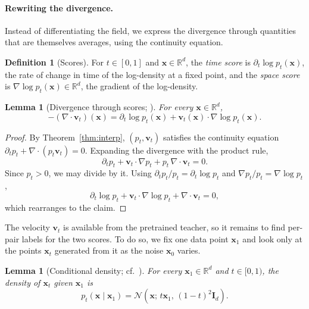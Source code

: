\documentclass[11pt,a4paper]{article}
\numberwithin{equation}{section}     %
\theoremstyle{plain}        %
\newtheorem{lemma}[theorem]{Lemma}
\theoremstyle{definition}   %
\newtheorem{definition}[theorem]{Definition}
\theoremstyle{remark}       %
\begin{document}
\paragraph{Rewriting the divergence.} Instead of differentiating the field, we express the divergence through quantities that are themselves averages, using the continuity equation.

\begin{definition}[Scores]\label{def:scores}
For $t\in[0,1]$ and $\mathbf{x}\in\mathbb{R}^d$, the \emph{time score} is $\partial_t\log p_t(\mathbf{x})$, the rate of change in time of the log-density at a fixed point, and the \emph{space score} is $\nabla\log p_t(\mathbf{x})\in\mathbb{R}^d$, the gradient of the log-density.
\end{definition}

\begin{lemma}[Divergence through scores; \citealp{ouyang2026}]\label{lem:divscores}
For every $\mathbf{x}\in\mathbb{R}^d$,
\[
-\left(\nabla\cdot\mathbf{v}_t\right)(\mathbf{x})=\partial_t\log p_t(\mathbf{x})+\mathbf{v}_t(\mathbf{x})\cdot\nabla\log p_t(\mathbf{x}).
\]
\end{lemma}

\begin{proof}
By Theorem~\ref{thm:interp}, $(p_t,\mathbf{v}_t)$ satisfies the continuity equation $\partial_tp_t+\nabla\cdot(p_t\mathbf{v}_t)=0$. Expanding the divergence with the product rule,
\[
\partial_tp_t+\mathbf{v}_t\cdot\nabla p_t+p_t\,\nabla\cdot\mathbf{v}_t=0 .
\]
Since $p_t>0$, we may divide by it. Using $\partial_tp_t/p_t=\partial_t\log p_t$ and $\nabla p_t/p_t=\nabla\log p_t$,
\[
\partial_t\log p_t+\mathbf{v}_t\cdot\nabla\log p_t+\nabla\cdot\mathbf{v}_t=0,
\]
which rearranges to the claim.
\end{proof}

The velocity $\mathbf{v}_t$ is available from the pretrained teacher, so it remains to find per-pair labels for the two scores. To do so, we fix one data point $\mathbf{x}_1$ and look only at the points $\mathbf{x}_t$ generated from it as the noise $\mathbf{x}_0$ varies.

\begin{lemma}[Conditional density; cf.\ \citealp{lipman2023}]\label{lem:conddens}
For every $\mathbf{x}_1\in\mathbb{R}^d$ and $t\in[0,1)$, the density of $\mathbf{x}_t$ given $\mathbf{x}_1$ is
\[
p_t(\mathbf{x}\mid\mathbf{x}_1)=\mathcal{N}\left(\mathbf{x};\,t\mathbf{x}_1,\,(1-t)^2\mathbf{I}_d\right).
\]
\end{lemma}
\end{document}
